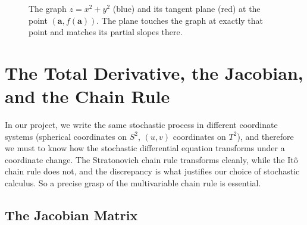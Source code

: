 \documentclass{article}
\begin{document}
\begin{figure}[H]
\centering
{}
\caption{The graph $z = x^2 + y^2$ (blue) and its tangent plane (red) at the point $(\mathbf{a}, f(\mathbf{a}))$. The plane touches the graph at exactly that point and matches its partial slopes there.}
\label{fig:tangent-plane-3d}
\end{figure}

\section{The Total Derivative, the Jacobian, and the Chain Rule}

In our project, we write the same stochastic process in different coordinate systems (spherical coordinates on $S^2$, $(u, v)$ coordinates on $T^2$), and therefore we must to know how the stochastic differential equation transforms under a coordinate change. The Stratonovich chain rule transforms cleanly, while the Itô chain rule does not, and the discrepancy is what justifies our choice of stochastic calculus. So a precise grasp of the multivariable chain rule is essential.

\subsection{The Jacobian Matrix}
\end{document}
